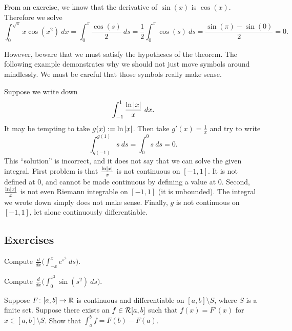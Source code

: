 \begin{example}
From an exercise, we know that the derivative of $\sin(x)$ is $\cos(x)$.
Therefore we solve
\begin{equation*}
\int_0^{\sqrt{\pi}} x \cos(x^2) ~ dx = \int_0^\pi \frac{\cos(s)}{2} ~ ds
=
\frac{1}{2}
\int_0^\pi \cos(s) ~ ds
=
\frac{
\sin(\pi) - \sin(0)
}{2}
=
0 .
\end{equation*}
\end{example}

However, beware that we must satisfy the hypotheses of the theorem.  The
following example demonstrates why we should not just 
move symbols around mindlessly.
We must be careful that those symbols really make sense.

\begin{example}
Suppose we write down
\begin{equation*}
\int_{-1}^{1} \frac{\ln \left\lvert {x} \right\rvert}{x} ~dx .
\end{equation*}
It may be tempting to take $g(x) := \ln \left\lvert {x} \right\rvert$.  Then take $g'(x) =
\frac{1}{x}$ and try to write
\begin{equation*}
\int_{g(-1)}^{g(1)} s ~ds = 
\int_{0}^{0} s ~ds = 0. 
\end{equation*}
This ``solution'' is incorrect, and it does not say
that we can solve the given integral.  First problem is that
$\frac{\ln \left\lvert {x} \right\rvert}{x}$ is not continuous on $[-1,1]$.
It is not defined at 0, and cannot be made continuous by defining a value at
0.
Second, $\frac{\ln \left\lvert {x} \right\rvert}{x}$ is not even Riemann integrable on $[-1,1]$
(it is unbounded).
The integral we wrote down simply does not make sense.
Finally, $g$ is not continuous 
on $[-1,1]$, let alone continuously differentiable.
\end{example}

\subsection{Exercises}

\begin{exercise}
Compute
$\displaystyle
\frac{d}{dx} \biggl( \int_{-x}^x e^{s^2}~ds \biggr)$.
\end{exercise}

\begin{exercise}
Compute
$\displaystyle
\frac{d}{dx} \biggl( \int_{0}^{x^2} \sin(s^2)~ds \biggr)$.
\end{exercise}

\begin{exercise}
Suppose $F \colon [a,b] \to {\mathbb{R}}$ is continuous and differentiable
on $[a,b] \setminus S$, where $S$ is a finite set.  Suppose there
exists an $f \in {\mathcal{R}}[a,b]$ such that $f(x) = F'(x)$ for $x \in [a,b]
\setminus S$.  Show that
$\int_a^b f = F(b)-F(a)$.
\end{exercise}

